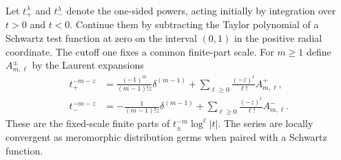 \documentclass[11pt,letterpaper]{article}
\theoremstyle{definition}\newtheorem{definition}[theorem]{Definition}
\theoremstyle{remark}\newtheorem{remark}[theorem]{Remark}
\begin{document}
Let $t_+^{\lambda}$ and $t_-^{\lambda}$ denote the one-sided powers,
acting initially by integration over $t>0$ and $t<0$. Continue them by
subtracting the Taylor polynomial of a Schwartz test function at zero
on the interval $(0,1)$ in the positive radial coordinate. The cutoff
one fixes a common finite-part scale. For $m\ge1$ define
$A_{m,\ell}^{\pm}$ by the Laurent expansions
\begin{align}
 t_+^{-m-z}
 &=\frac{(-1)^m}{(m-1)!z}\delta^{(m-1)}
   +\sum_{\ell\ge0}\frac{(-z)^\ell}{\ell!}A_{m,\ell}^+,
 \label{mr:eq:halfplus}\\
 t_-^{-m-z}
 &=-\frac1{(m-1)!z}\delta^{(m-1)}
   +\sum_{\ell\ge0}\frac{(-z)^\ell}{\ell!}A_{m,\ell}^-.
 \label{mr:eq:halfminus}
\end{align}
These are the fixed-scale finite parts of
$t_\pm^{-m}\log^\ell|t|$. The series are locally convergent as
meromorphic distribution germs when paired with a Schwartz function.
\end{document}
